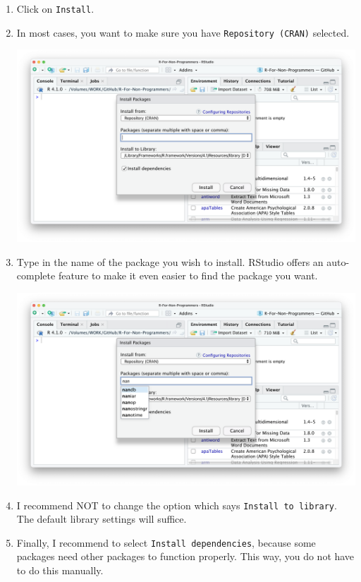 \documentclass[
  letterpaper,
  DIV=11,
  numbers=noendperiod]{scrreprt}
\begin{document}
\begin{enumerate}
\def\labelenumi{\arabic{enumi}.}
\item
  Click on \texttt{Install}.
\item
  In most cases, you want to make sure you have
  \texttt{Repository\ (CRAN)} selected.

  \includegraphics{images/chapter_05_img/install_r_packages/01_install_r_packages.png}
\item
  Type in the name of the package you wish to install. RStudio offers an
  auto-complete feature to make it even easier to find the package you
  want.

  \includegraphics{images/chapter_05_img/install_r_packages/02_install_r_packages.png}
\item
  I recommend NOT to change the option which says
  \texttt{Install\ to\ library}. The default library settings will
  suffice.
\item
  Finally, I recommend to select \texttt{Install\ dependencies}, because
  some packages need other packages to function properly. This way, you
  do not have to do this manually.


\end{enumerate}
\end{document}
